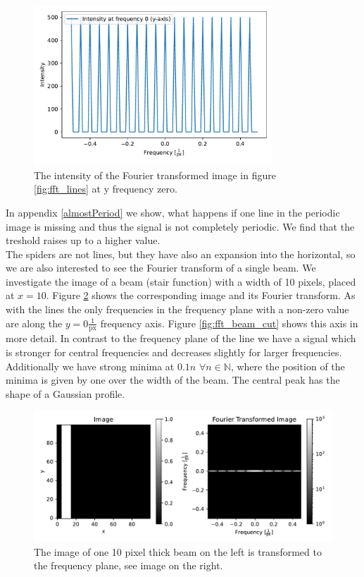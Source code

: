 \begin{figure}[H]
	\centering
		\includegraphics[width=0.8\textwidth]{pics/fft_simulation_cutmorelines.pdf}
		\caption{The intensity of the Fourier transformed image in figure \ref{fig:fft_lines} at y frequency zero.}
		\label{fig:fft_lines_cut}
\end{figure}
In appendix \ref{almostPeriod} we show, what happens if one line in the periodic image is missing and thus the signal is not completely periodic. We find that the treshold raises up to a higher value.\\
The spiders are not lines, but they have also an expansion into the horizontal, so we are also interested to see the Fourier transform of a single beam. We investigate the image of a beam (stair function) with a width of 10 pixels, placed at $x=10$. Figure \ref{fig:fft_beam} shows the corresponding image and its Fourier transform. As with the lines the only frequencies in the frequency plane with a non-zero value are along the $y=0 \frac{1}{\mathrm{px}}$ frequency axis. Figure \ref{fig:fft_beam_cut} shows this axis in more detail. In contrast to the frequency plane of the line we have a signal which is stronger for central frequencies and decreases slightly for larger frequencies. Additionally we have strong minima at $0.1 n$ $\forall n \in \mathbb{N}$, where the position of the minima is given by one over the width of the beam. The central peak has the shape of a Gaussian profile.
\begin{figure}[H]
	\centering
		\includegraphics[width=1.0\textwidth]{pics/fft_simulationonebeam.pdf}
		\caption{The image of one 10 pixel thick beam on the left is transformed to the frequency plane, see image on the right.}
		\label{fig:fft_beam}
\end{figure}

